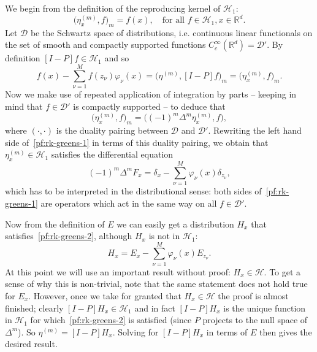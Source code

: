 \documentclass{article}
\newcommand{\mc}[1]{\mathcal{#1}}
\newcommand{\Reals}{\mathbb{R}} %
\newcommand{\Rd}{\Reals^d}
\newcommand{\1}{\mathbf{1}}
\begin{document}
We begin from the definition of the reproducing kernel of $\mc{H}_1$:
\begin{equation*}
\bigl(\eta_x^{(m)},f\bigr)_m = f(x), \quad \textrm{for all $f \in \mc{H}_1, x \in \Reals^d$.}
\end{equation*}
Let $\mc{D}$ be the Schwartz space of distributions, i.e. continuous linear functionals on the set of smooth and compactly supported functions $C_c^{\infty}(\Rd) = \mc{D}'$. By definition $[I - P]f \in \mc{H}_1$ and so
\begin{equation}
\label{pf:rk-greens-1}
f(x) - \sum_{\nu = 1}^{M} f(z_{\nu}) \varphi_{\nu}(x) = \bigl(\eta^{(m)},[I - P]f\bigr)_m = \bigl(\eta_x^{(m)},f\bigr)_m.
\end{equation}
Now we make use of repeated application of integration by parts -- keeping in mind that $f \in \mc{D}'$ is compactly supported -- to deduce that
\begin{equation*}
\bigl(\eta_x^{(m)},f\bigr)_m = \bigl((-1)^m \Delta^m \eta_x^{(m)},f\bigr),
\end{equation*}
where $(\cdot,\cdot)$ is the duality pairing between $\mc{D}$ and $\mc{D}'$. Rewriting the left hand side of~\eqref{pf:rk-greens-1} in terms of this duality pairing, we obtain that $\eta_x^{(m)} \in \mc{H}_1$ satisfies the differential equation
\begin{equation}
\label{pf:rk-greens-2}
(-1)^m \Delta^m F_x = \delta_{x} - \sum_{\nu = 1}^{M} \varphi_{\nu}(x) \delta_{z_\nu},
\end{equation}
which has to be interpreted in the distributional sense: both sides of~\eqref{pf:rk-greens-1} are operators which act in the same way on all $f \in \mc{D}'$.

Now from the definition of $E$ we can easily get a distribution $H_x$ that satisfies~\eqref{pf:rk-greens-2}, although $H_x$ is not in $\mc{H}_1$:
\begin{equation*}
H_x = E_x - \sum_{\nu = 1}^{M} \varphi_{\nu}(x) E_{z_{\nu}}.
\end{equation*}
At this point we will use an important result without proof: $H_x \in \mc{H}$. To get a sense of why this is non-trivial, note that the same statement does not hold true for $E_x$. However, once we take for granted that $H_x \in \mc{H}$ the proof is almost finished; clearly $[I - P]H_x \in \mc{H}_1$ and in fact $[I - P]H_x$ is the unique function in $\mc{H}_1$ for which~\eqref{pf:rk-greens-2} is satisfied (since $P$ projects to the null space of $\Delta^m$). So $\eta^{(m)} = [I - P]H_x$. Solving for $[I - P]H_x$ in terms of $E$ then gives the desired result.
\end{document}
